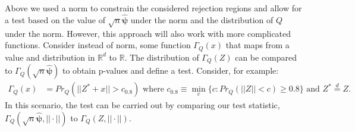 \documentclass{article}
\newcommand{\disto}{P}
\newcommand{\rvv}{Z}
\newcommand{\distv}{Q}
\begin{document}
Above we used a norm to constrain the considered rejection regions and allow for a test based on the value of $\sqrt{n}\hat{\boldsymbol{\psi}}$ under the norm and the distribution of $\distv$ under the norm.  However, this approach will also work with more complicated functions. Consider instead of norm, some function $\Gamma_{\distv}(x)$ that maps from a value and distribution in $\mathbb{R}^d$ to $\mathbb{R}$.  The distribution of $\Gamma_\distv(\rvv)$ can be compared to $\Gamma_\distv(\sqrt{n}\hat{\boldsymbol{\psi}})$ to obtain p-values and define a test. Consider, for example:
\begin{align*}
	\Gamma_\distv(x) &= Pr_\distv(||\rvv^* + x|| > c_{0.8})  \text{ where }  c_{0.8} \equiv \min_{c}\{c : Pr_\distv(||\rvv|| < c) \geq 0.8 \} \text{ and } \rvv^* \overset{d}{=} \rvv.
\end{align*}
In this scenario, the test can be carried out by comparing our test statistic, $\Gamma_\distv(\sqrt{n}\hat{\boldsymbol{\psi}}, ||\cdot||)$ to $\Gamma_\distv(\rvv, ||\cdot||).$


\end{document}
